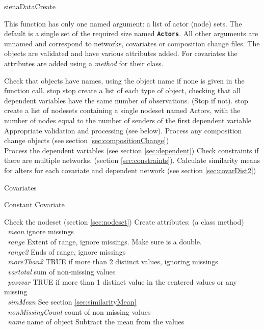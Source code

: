 \documentclass[12pt,a4paper]{article}
\makeatletter
\renewcommand{\=}{\,=\,}
\newcommand{\+}{\,+\,}
\newcommand{\nnm}[1]{\textsf{\textit{#1}}}
\renewcommand{\section}{\@startsection{section}{1}
                {0pt}{\baselineskip}{0.5\baselineskip}
                {\centering\sffamily} }
\renewcommand{\subsection}{\@startsection{subsection}{2}
                {0pt}{0.7\baselineskip}{0.3\baselineskip}
                {\sffamily} }
\renewcommand{\subsubsection}{\@startsection{subsubsection}{3}
                {0pt}{0.5\baselineskip}{0.3\baselineskip}
                {\it\sffamily} }
\newcommand{\sfn}[1]{\textbf{\texttt{#1}}}
\makeatother
\begin{document}
\section{sienaDataCreate}

This function has only one named argument: a list of actor (node) sets. The
default is a single set of the required size named \sfn{Actors}. All other
arguments are unnamed and correspond to networks, covariates or composition
change files. The objects are validated and have various attributes
added. For covariates the attributes are added using a \emph{method} for their
class.

\begin{algorithmic}
\STATE Check that objects have names, using the object name if none is given in
the function call.
\STATE stop
\ENDIF
{}
\STATE stop
\ENDIF
\STATE create a list of each type of object, checking that all dependent
variables have the same number of observations. (Stop if not).
\STATE stop
\ENDIF
{}
\STATE create a list of nodesets containing a single
nodeset named Actors, with the number of nodes equal to the number of senders of
the first dependent variable
\ENDIF
{}
\STATE Appropriate validation and processing (see below).
\ENDFOR
\STATE Process any composition change objects (see section
\ref{sec:compositionChange}) \\
\STATE Process the dependent variables (see section \ref{sec:dependent})
\STATE Check constraints if there are multiple networks. (section
\ref{sec:constraints}).
\STATE Calculate similarity means for alters for each covariate and dependent
network (see section \ref{sec:covarDist2})
\end{algorithmic}
\subsection{ Covariates}
\subsubsection{Constant Covariate}
\begin{algorithmic}
\STATE Check the nodeset (section \ref{sec:nodeset})
\STATE Create attributes: (a class method)\\
\sfn{ }\nnm{mean} ignore missings\\
\sfn{ }\nnm{range} Extent of range, ignore missings. Make sure is a double.\\
\sfn{ }\nnm{range2} Ends of range, ignore missings\\
\sfn{ }\nnm{moreThan2} TRUE if more than 2 distinct values, ignoring missings\\
\sfn{ }\nnm{vartotal} sum of non-missing values\\
\sfn{ }\nnm{poszvar} TRUE if more than 1 distinct value in the centered values
or any missing\\
\sfn{ }\nnm{simMean} See section \ref{sec:similarityMean}\\
\sfn{ }\nnm{nonMissingCount} count of non missing values\\
\sfn{ }\nnm{name} name of object
\STATE Subtract the mean from the values
\end{algorithmic}
\end{document}
